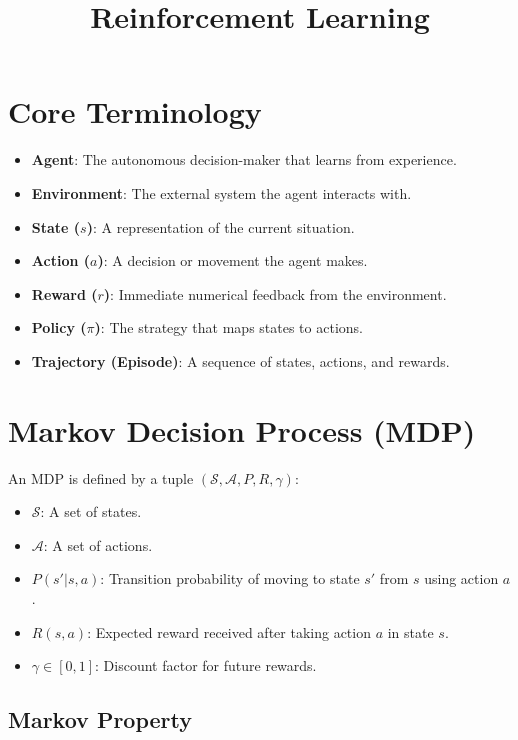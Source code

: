 \documentclass[12pt]{article}
\title{Reinforcement Learning}
\date{}
\begin{document}
\maketitle

\section*{Core Terminology}
\begin{itemize}
    \item \textbf{Agent}: The autonomous decision-maker that learns from experience.
    \item \textbf{Environment}: The external system the agent interacts with.
    \item \textbf{State ($s$)}: A representation of the current situation.
    \item \textbf{Action ($a$)}: A decision or movement the agent makes.
    \item \textbf{Reward ($r$)}: Immediate numerical feedback from the environment.
    \item \textbf{Policy ($\pi$)}: The strategy that maps states to actions.
    \item \textbf{Trajectory (Episode)}: A sequence of states, actions, and rewards.
\end{itemize}

\section{Markov Decision Process (MDP)}

An MDP is defined by a tuple $(\mathcal{S}, \mathcal{A}, P, R, \gamma)$:
\begin{itemize}
    \item $\mathcal{S}$: A set of states.
    \item $\mathcal{A}$: A set of actions.
    \item $P(s'|s,a)$: Transition probability of moving to state $s'$ from $s$ using action $a$.
    \item $R(s,a)$: Expected reward received after taking action $a$ in state $s$.
    \item $\gamma \in [0,1]$: Discount factor for future rewards.
\end{itemize}

\subsection*{Markov Property}
\end{document}
